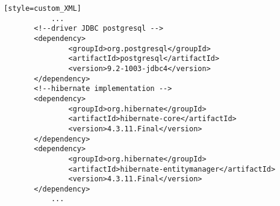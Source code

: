 \begin{lstlisting} [style=custom_XML]
			...
		<!--driver JDBC postgresql -->
		<dependency>
				<groupId>org.postgresql</groupId>
				<artifactId>postgresql</artifactId>
				<version>9.2-1003-jdbc4</version>
		</dependency>
		<!--hibernate implementation -->
		<dependency>
				<groupId>org.hibernate</groupId>
				<artifactId>hibernate-core</artifactId>
				<version>4.3.11.Final</version>
		</dependency>
		<dependency>
				<groupId>org.hibernate</groupId>
				<artifactId>hibernate-entitymanager</artifactId>
				<version>4.3.11.Final</version>
		</dependency>
			...
\end{lstlisting}